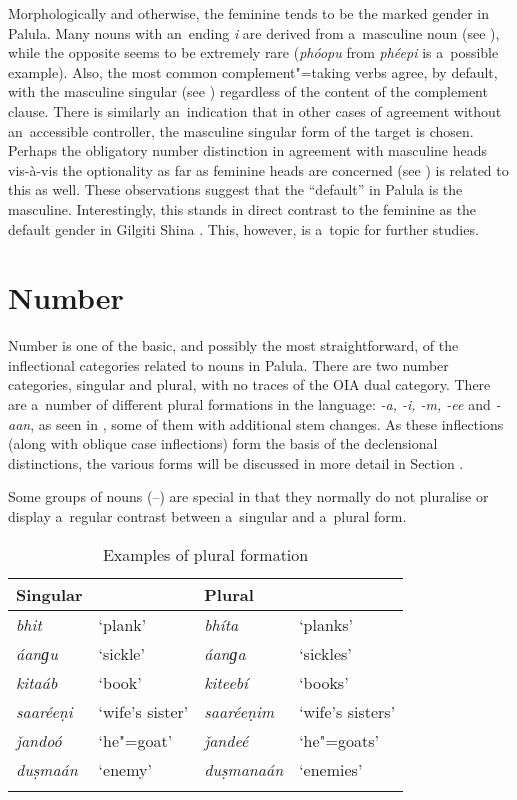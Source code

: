 Morphologically and otherwise, the feminine tends to be the marked gender in Palula. Many nouns with an~ending \textit{i} are derived from a~masculine noun (see ), while the opposite seems to be extremely rare (\textit{phóopu} from \textit{phéepi} is a~possible example). Also, the most common complement"=taking verbs agree, by default, with the masculine singular (see ) regardless of the content of the complement clause. There is similarly an~indication that in other cases of agreement without an~accessible controller, the masculine singular form of the target is chosen. Perhaps the obligatory number distinction in agreement with masculine heads vis-à-vis the optionality as far as feminine heads are concerned (see ) is related to this as well. These observations suggest that the ``default'' in Palula is the masculine. Interestingly, this stands in direct contrast to the feminine as the default gender in Gilgiti Shina \citep{hookzia1987}. This, however, is a~topic for further studies.

\section{Number}
\label{sec:4-4}

Number is one of the basic, and possibly the most straightforward, of the inflectional categories related to nouns in Palula. There are two number categories, singular and plural, with no traces of the OIA dual category. There are a~number of different plural formations in the language: \textit{-a, -i, -m, -ee} and \textit{-aan}, as seen in , some of them with additional stem changes. As these inflections (along with oblique case inflections) form the basis of the declensional distinctions, the various forms will be discussed in more detail in Section . 

Some groups of nouns (--) are special in that they normally do not pluralise or display a~regular contrast between a~singular and a~plural form.



\begin{table}[ht]
\caption{Examples of plural formation}
\begin{tabularx}{\textwidth}{ Q Q Q Q }
\lsptoprule
Singular &
&
Plural &
\\\hline
\textit{bhit} &
`plank' &
\textit{bhíta} &
`planks'\\
\textit{áanɡu} &
`sickle' &
\textit{áanɡa} &
`sickles'\\
\textit{kitaáb} &
`book' &
\textit{kiteebí} &
`books'\\
\textit{saaréeṇi} &
`wife's sister' &
\textit{saaréeṇim} &
`wife's sisters'\\
\textit{ǰandoó} &
`he"=goat' &
\textit{ǰandeé} &
`he"=goats'\\
\textit{duṣmaán} &
`enemy' &
\textit{duṣmanaán} &
`enemies'\\\lspbottomrule
\end{tabularx}
\label{tab:4-5}
\end{table}

